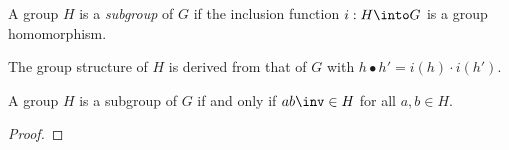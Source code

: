 \documentclass{amsart}
\begin{document}
\begin{defn}
  A group $H$ is a \emph{subgroup} of $G$ if the inclusion function $i : H \into G$ is a group homomorphism.
\end{defn}
The group structure of $H$ is derived from that of $G$ with $h \bullet h' = i(h) \cdot i(h')$.

\begin{lem}
  A group $H$ is a subgroup of $G$ if and only if $ab\inv \in H$ for all $a, b \in H$.
\end{lem}
\begin{proof}

\end{proof}
\end{document}

